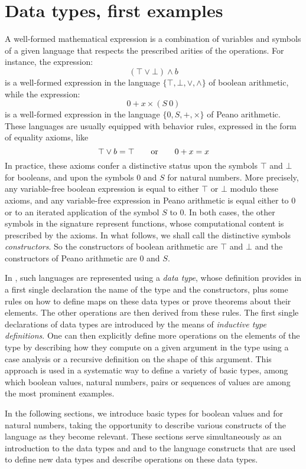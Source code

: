 \section{Data types, first examples}
\label{sec:data}
A well-formed mathematical expression is a combination of variables
and symbols of a given language
that respects the prescribed arities of
the operations. For instance, the expression:
\[(\top \vee \bot) \wedge b\]
is a well-formed expression in the language $\{\top, \bot,\vee,\wedge\}$ of
boolean arithmetic, while the expression:
\[ 0 + x \times (S\ 0) \]
is a well-formed expression in the language $\{0,S, +, \times\}$ of
Peano arithmetic.  These languages are usually equipped with
behavior rules, expressed in the form of equality axioms, like
\[\top \vee b = \top \qquad \hbox{or} \qquad 0 + x = x\]
In
practice, these axioms confer a distinctive status upon
the symbols $\top$ and $\bot$ for booleans, and upon the symbols $0$ and
$S$ for natural numbers.  More precisely, any variable-free boolean expression
is equal to either $\top$ or $\bot$ modulo these axioms, and any
variable-free expression in Peano arithmetic is equal either to $0$ or
to an iterated application of the symbol $S$ to $0$.  In both
cases, the other symbols in the signature represent functions, whose
computational content is prescribed by the axioms.  In what follows,
we shall call the distinctive symbols \emph{constructors}.  So the constructors
of boolean arithmetic are \(\top\) and \(\bot\) and the constructors of
Peano arithmetic are \(0\) and \(S\).

In \Coq{}, such languages are represented using a \emph{data type},
whose definition provides in a first single declaration the name of the
type and the constructors, plus some rules on how to define maps on
these data types or prove theorems about their elements.  The other
operations are then derived from these rules.
The first single declarations of data types are introduced by the means of
\emph{inductive type definitions}.
One can then explicitly define more operations on the elements of
the type by describing how they compute on a given argument in the
type using a case analysis or a recursive definition on the
shape of this argument.
This approach is used in a systematic way to define a variety of basic
types, among which boolean values, natural numbers, pairs or
sequences of values are among the most prominent examples.

In the following sections, we introduce basic types  for boolean
values and  for natural numbers, taking the opportunity to describe
various constructs of the \Coq{} language as they become relevant.  These
sections serve simultaneously as an introduction to the data types
 and  and to the \Coq{} language constructs that
are used to define new data types and describe operations on these
data types.
